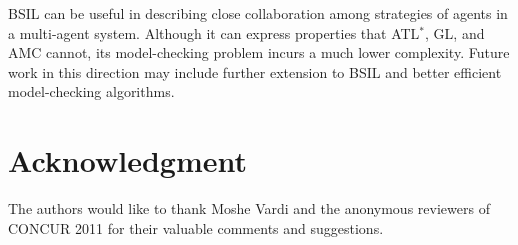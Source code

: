 \documentclass[11pt]{article}
\begin{document}
BSIL can be useful in describing close collaboration among strategies of 
agents in a multi-agent system. 
Although it can express properties that
ATL$^*$, GL, and AMC cannot, its model-checking problem incurs a
much lower complexity.  
Future work in this direction may include
further extension to BSIL and 
better efficient model-checking algorithms.  

\section*{Acknowledgment}
The authors would like to thank Moshe Vardi and the anonymous reviewers of CONCUR 2011 for their valuable comments and suggestions. 





\end{document}
